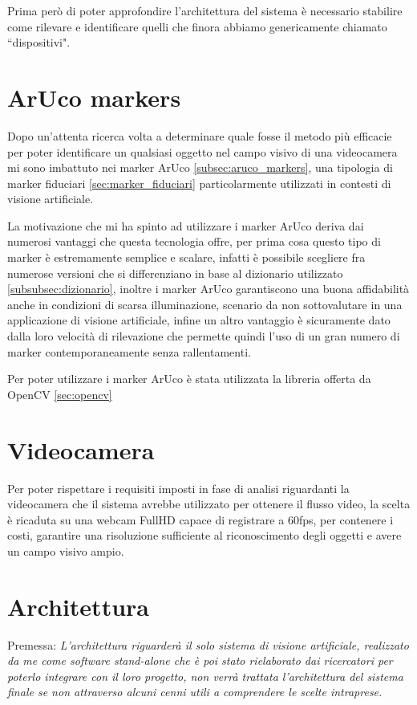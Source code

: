 \documentclass[12pt,a4paper,openright,twoside]{book}
\begin{document}
Prima però di poter approfondire l'architettura del sistema è necessario stabilire come rilevare e identificare quelli che finora abbiamo genericamente chiamato ``dispositivi".

\section{ArUco markers}
Dopo un'attenta ricerca volta a determinare quale fosse il metodo più efficacie per poter identificare un qualsiasi oggetto nel campo visivo di una videocamera mi sono imbattuto nei marker ArUco \ref{subsec:aruco_markers}, una tipologia di marker fiduciari \ref{sec:marker_fiduciari} particolarmente utilizzati in contesti di visione artificiale.

La motivazione che mi ha spinto ad utilizzare i marker ArUco deriva dai numerosi vantaggi che questa tecnologia offre, per prima cosa questo tipo di marker è estremamente semplice e scalare, infatti è possibile scegliere fra numerose versioni che si differenziano in base al dizionario utilizzato \ref{subsubsec:dizionario}, inoltre i marker ArUco garantiscono una buona affidabilità anche in condizioni di scarsa illuminazione, scenario da non sottovalutare in una applicazione di visione artificiale, infine un altro vantaggio è sicuramente dato dalla loro velocità di rilevazione che permette quindi l'uso di un gran numero di marker contemporaneamente senza rallentamenti.

Per poter utilizzare i marker ArUco è stata utilizzata la libreria offerta da OpenCV \ref{sec:opencv}

\section{Videocamera}
Per poter rispettare i requisiti imposti in fase di analisi riguardanti la videocamera che il sistema avrebbe utilizzato per ottenere il flusso video, la scelta è ricaduta su una webcam FullHD capace di registrare a 60fps, per contenere i costi, garantire una risoluzione sufficiente al riconoscimento degli oggetti e avere un campo visivo ampio.

\section{Architettura}
Premessa: \textit{L'architettura riguarderà il solo sistema di visione artificiale, realizzato da me come software stand-alone che è poi stato rielaborato dai ricercatori per poterlo integrare con il loro progetto, non verrà trattata l'architettura del sistema finale se non attraverso alcuni cenni utili a comprendere le scelte intraprese.}
\vspace{0.5cm}
\end{document}
